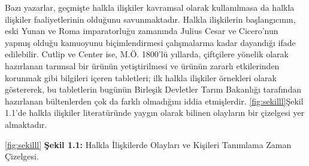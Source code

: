 \documentclass[
]{book}
\begin{document}
Bazı yazarlar, geçmişte halkla ilişkiler kavramsal olarak kullanılmasa da halkla ilişkiler faaliyetlerinin olduğunu savunmaktadır. Halkla ilişkilerin başlangıcının, eski Yunan ve Roma imparatorluğu zamanında Julius Cesar ve Cicero'nun yapmış olduğu kamuoyunu biçimlendirmesi çalışmalarına kadar dayandığı ifade edilebilir. Cutlip ve Center ise, M.Ö. 1800'lü yıllarda, çiftçilere yönelik olarak hazırlanan tarımsal bir ürünün yetiştirilmesi ve ürünün zararlı etkilerinden korunmak gibi bilgileri içeren tabletleri; ilk halkla ilişkiler örnekleri olarak göstererek, bu tabletlerin bugünün Birleşik Devletler Tarım Bakanlığı tarafından hazırlanan bültenlerden çok da farklı olmadığını iddia etmişlerdir.\citep{peltekoglu2016halkla} \ref{fig:sekilll}Şekil 1.1'de halkla ilişkiler literatüründe yaygın olarak bilinen olayların bir çizelgesi yer almaktadır.

\ref{fig:sekilll}
\textbf{Şekil 1.1:} Halkla İlişkilerde Olayları ve Kişileri Tanımlama Zaman Çizelgesi.
\end{document}
